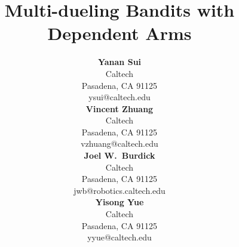 \documentclass{article}
\title{Multi-dueling Bandits with Dependent Arms}
\author{ {\bf Yanan Sui} \\
Caltech          \\
Pasadena, CA 91125 \\
ysui@caltech.edu \\
 \And
 {\bf Vincent Zhuang}  \\
Caltech          \\
Pasadena, CA 91125 \\
vzhuang@caltech.edu \\
 \And
 {\bf Joel W.~Burdick}   \\
Caltech         \\
Pasadena, CA 91125 \\
jwb@robotics.caltech.edu \\
 \And
 {\bf Yisong Yue}   \\
Caltech          \\
Pasadena, CA 91125 \\
yyue@caltech.edu \\
}
\begin{document}
\maketitle



%









\newpage
\begin{small}


\end{small}

\newpage

\end{document}

